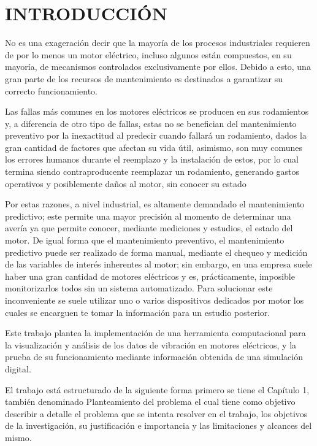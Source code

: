 \thispagestyle{empty}
\section{INTRODUCCIÓN}

No es una exageración decir que la mayoría de los procesos industriales
requieren de por lo menos un motor eléctrico, incluso algunos están compuestos, en su
mayoría, de mecanismos controlados exclusivamente por ellos. Debido a esto,
una gran parte de los recursos de mantenimiento es destinados a garantizar
su correcto funcionamiento.

Las fallas más comunes en los motores eléctricos se producen en sus rodamientos
y, a diferencia de otro tipo de fallas, estas no se benefician
del mantenimiento preventivo por la inexactitud al predecir cuando
fallará un rodamiento, dados la gran cantidad de factores que afectan su vida útil,
asimismo, son muy comunes los errores humanos durante el reemplazo y la instalación de
estos, por lo
cual termina siendo contraproducente reemplazar un rodamiento,
generando gastos operativos y posiblemente daños al motor,
sin conocer su estado

Por estas razones, a nivel industrial, es altamente demandado el mantenimiento
predictivo; este permite una mayor precisión al momento de determinar una avería
ya que permite conocer, mediante mediciones y estudios, el estado del motor.
De igual forma que el mantenimiento preventivo, el mantenimiento predictivo puede
ser realizado de forma manual, mediante el chequeo y medición de las variables de
interés inherentes al motor; sin embargo, en una empresa suele haber una gran cantidad
de motores eléctricos y es, prácticamente, imposible monitorizarlos todos sin un sistema
automatizado. Para solucionar este inconveniente se suele utilizar
uno o varios dispositivos dedicados por motor los cuales se encarguen te tomar
la información para un estudio posterior.

Este trabajo plantea la implementación de una herramienta computacional para la
visualización y análisis de los datos de vibración en motores eléctricos, y la
prueba de su funcionamiento mediante información obtenida de una
simulación digital.

El trabajo está estructurado de la siguiente forma primero se tiene el Capítulo
1, también denominado Planteamiento del problema el cual tiene como objetivo
describir a detalle el problema que se intenta resolver en el trabajo, los
objetivos de la investigación, su justificación e importancia y las
limitaciones y alcances del mismo.

